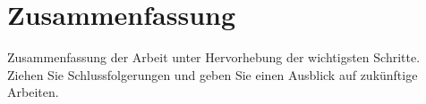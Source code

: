 \chapter{Zusammenfassung}\label{ch:5}

Zusammenfassung der Arbeit unter Hervorhebung der wichtigsten Schritte. Ziehen Sie Schlussfolgerungen und geben Sie einen Ausblick auf zukünftige Arbeiten.